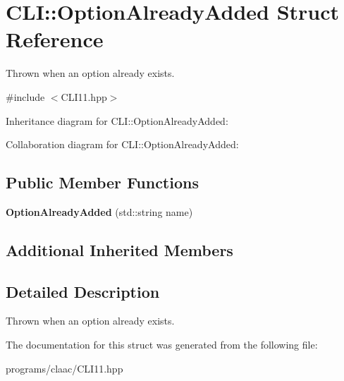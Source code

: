 \hypertarget{struct_c_l_i_1_1_option_already_added}{}\section{C\+LI\+:\+:Option\+Already\+Added Struct Reference}
\label{struct_c_l_i_1_1_option_already_added}


Thrown when an option already exists.  




{\ttfamily \#include $<$C\+L\+I11.\+hpp$>$}



Inheritance diagram for C\+LI\+:\+:Option\+Already\+Added\+:


Collaboration diagram for C\+LI\+:\+:Option\+Already\+Added\+:
\subsection*{Public Member Functions}
\begin{DoxyCompactItemize}
\item 
\mbox{\label{struct_c_l_i_1_1_option_already_added_a2157496f3b017fa4894fd4950206101c}} 
{\bfseries Option\+Already\+Added} (std\+::string name)
\end{DoxyCompactItemize}
\subsection*{Additional Inherited Members}


\subsection{Detailed Description}
Thrown when an option already exists. 

The documentation for this struct was generated from the following file\+:\begin{DoxyCompactItemize}
\item 
programs/claac/C\+L\+I11.\+hpp\end{DoxyCompactItemize}
